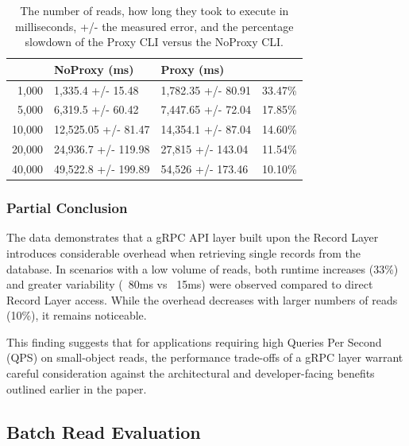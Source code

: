 \documentclass[sigconf]{acmart}
\begin{document}
\begin{table}[h]
\begin{tabular}{|r|l|l|r|}
    \hline
    \rowcolor[HTML]{656565} 
    \multicolumn{1}{|l|}{\cellcolor[HTML]{656565}{\color[HTML]{FFFFFF} \textbf{Reads}}} &
        {\color[HTML]{FFFFFF} \textbf{NoProxy (ms)}} &
        {\color[HTML]{FFFFFF} \textbf{Proxy (ms)}} &
        \multicolumn{1}{l|}{\cellcolor[HTML]{656565}{\color[HTML]{FFFFFF} \textbf{Slowdown}}} \\ \hline
    1,000  & 1,335.4 +/- 15.48   & 1,782.35 +/- 80.91 & 33.47\% \\
    \rowcolor[HTML]{EFEFEF} 
    5,000  & 6,319.5 +/- 60.42   & 7,447.65 +/- 72.04 & 17.85\% \\
    10,000 & 12,525.05 +/- 81.47 & 14,354.1 +/- 87.04 & 14.60\% \\
    \rowcolor[HTML]{EFEFEF} 
    20,000 & 24,936.7 +/- 119.98 & 27,815 +/- 143.04  & 11.54\% \\
    40,000 & 49,522.8 +/- 199.89 & 54,526 +/- 173.46  & 10.10\% \\ \hline
\end{tabular}
\caption{The number of reads, how long they took to execute in milliseconds, +/- the measured error, and the percentage slowdown of the Proxy CLI versus the NoProxy CLI.}
\end{table}

\subsubsection{Partial Conclusion}

The data demonstrates that a gRPC API layer built upon the Record Layer introduces considerable overhead when retrieving single records from the database. In scenarios with a low volume of reads, both runtime increases (33\%) and greater variability (~80ms vs ~15ms) were observed compared to direct Record Layer access. While the overhead decreases with larger numbers of reads (10\%), it remains noticeable.

This finding suggests that for applications requiring high Queries Per Second (QPS) on small-object reads, the performance trade-offs of a gRPC layer warrant careful consideration against the architectural and developer-facing benefits outlined earlier in the paper.

\subsection{Batch Read Evaluation}
\end{document}
